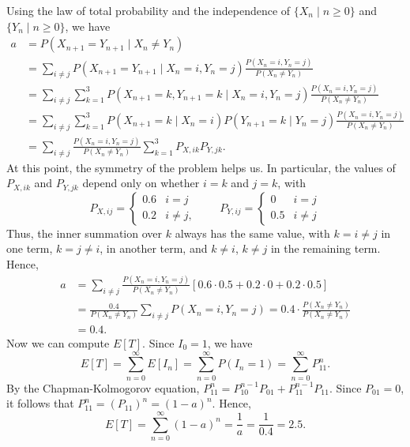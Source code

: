 \documentclass{homework}
\begin{document}
\begin{alphaparts}
	 	Using the law of total probability and the independence of $\{X_n \mid n \ge 0\}$ and $\{Y_n \mid n \ge 0\}$, we have
		\begin{align*}
			a &= P(X_{n+1} = Y_{n+1} \mid X_n\ne Y_n) \\
			&= \sum_{i\ne j} P(X_{n+1} = Y_{n+1} \mid X_n = i, Y_n = j) \frac{P(X_n=i, Y_n = j)}{P(X_n \ne Y_n)} \\
			&= \sum_{i\ne j} \sum_{k=1}^3 P(X_{n+1}=k, Y_{n+1}=k\mid X_n = i, Y_n=j) \frac{P(X_n=i, Y_n = j)}{P(X_n \ne Y_n)} 	\\
			&= \sum_{i\ne j}\sum_{k=1}^3 P(X_{n+1}=k\mid X_n = i)P(Y_{n+1} = k \mid Y_n=j) \frac{P(X_n=i, Y_n = j)}{P(X_n \ne 	Y_n)} \\
			&= \sum_{i\ne j}\frac{P(X_n=i, Y_n = j)}{P(X_n \ne Y_n)}\sum_{k=1}^3 P_{X,ik}P_{Y,jk}.\tag{$*$}
		\end{align*}
		At this point, the symmetry of the problem helps us. In particular, the values of $P_{X,ik}$ and $P_{Y,jk}$ depend only on whether $i=k$ and $j=k$, with
		\begin{equation*}
			P_{X,ij} = \begin{cases}
				0.6 & i = j\\
				0.2 & i \ne j,
			\end{cases}
			\qquad
			P_{Y,ij} = \begin{cases}
				0 & i = j \\
				0.5 & i\ne j
			\end{cases}
		\end{equation*}
		Thus, the inner summation over $k$ always has the same value, with $k=i \ne j$ in one term, $k = j \ne i$, in another term, and $k\ne i$, $k \ne j$ in the remaining term. Hence,
		\begin{align*}
			a &= \sum_{i\ne j}\frac{P(X_n=i, Y_n = j)}{P(X_n \ne Y_n)} \left[0.6\cdot 0.5 + 0.2 \cdot 0 + 0.2 \cdot 	0.5\right] \\
			&= \frac{0.4}{P(X_n \ne Y_n)}\sum_{i\ne j} P(X_n=i, Y_n=j) = 0.4\cdot \frac{P(X_n \ne Y_n)}{P(X_n \ne Y_n)} \\
			&= 0.4.
		\end{align*}
		Now we can compute $E[T]$. Since $I_0 = 1$, we have
		\begin{equation*}
			E[T] = \sum_{n=0}^\infty E[I_n] = \sum_{n=0}^\infty P(I_n = 1) = \sum_{n=0}^\infty P^n_{11}.
		\end{equation*}
		By the Chapman-Kolmogorov equation, $P^n_{11} = P^{n-1}_{10}P_{01} + P^{n-1}_{11}P_{11}$. Since $P_{01} = 0$, it follows that $P^n_{11} = \left(P_{11}\right)^n = (1-a)^n$. Hence,
		\begin{equation*}
			E[T] = \sum_{n=0}^\infty (1-a)^n = \frac{1}{a} = \frac{1}{0.4} = 2.5.
		\end{equation*}
		

\end{alphaparts}
\end{document}

